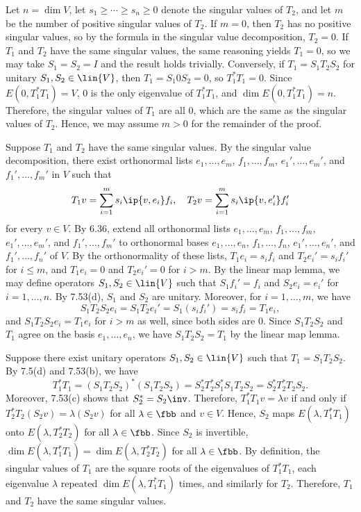 \begin{sol}
    Let $n = \dim V$, let $s_1 \geq \cdots \geq s_n \geq 0$ denote the singular values of $T_2$, and let $m$ be the number of positive singular values of $T_2$.
    If $m = 0$, then $T_2$ has no positive singular values, so by the formula in the singular value decomposition, $T_2 = 0$.
    If $T_1$ and $T_2$ have the same singular values, the same reasoning yields $T_1 = 0$, so we may take $S_1 = S_2 = I$ and the result holds trivially.
    Conversely, if $T_1 = S_1 T_2 S_2$ for unitary $S_1, S_2 \in \lin{V}$, then $T_1 = S_1 0 S_2 = 0$, so $T_1^\ast T_1 = 0$.
    Since $E(0, T_1^\ast T_1) = V$, $0$ is the only eigenvalue of $T_1^\ast T_1$, and $\dim E(0, T_1^\ast T_1) = n$.
    Therefore, the singular values of $T_1$ are all $0$, which are the same as the singular values of $T_2$.
    Hence, we may assume $m > 0$ for the remainder of the proof.
    
    \rightimp Suppose $T_1$ and $T_2$ have the same singular values.
    By the singular value decomposition, there exist orthonormal lists $e_1, \ldots, e_m$, $f_1, \ldots, f_m$, $e_1', \ldots, e_m'$, and $f_1', \ldots, f_m'$ in $V$ such that
    \[
        T_1 v = \sum_{i=1}^m s_i \ip{v, e_i} f_i, \quad T_2 v = \sum_{i=1}^m s_i \ip{v, e_i'} f_i'
    \]
    for every $v \in V$.
    By 6.36, extend all orthonormal lists $e_1, \ldots, e_m$, $f_1, \ldots, f_m$, $e_1', \ldots, e_m'$, and $f_1', \ldots, f_m'$ to orthonormal bases $e_1, \ldots, e_n$, $f_1, \ldots, f_n$, $e_1', \ldots, e_n'$, and $f_1', \ldots, f_n'$ of $V$.
    By the orthonormality of these lists, $T_1 e_i = s_i f_i$ and $T_2 e_i' = s_i f_i'$ for $i \leq m$, and $T_1 e_i = 0$ and $T_2 e_i' = 0$ for $i > m$.
    By the linear map lemma, we may define operators $S_1, S_2 \in \lin{V}$ such that $S_1 f_i' = f_i$ and $S_2 e_i = e_i'$ for $i = 1, \ldots, n$.
    By 7.53(d), $S_1$ and $S_2$ are unitary.
    Moreover, for $i = 1, \ldots, m$, we have
    \[
        S_1 T_2 S_2 e_i = S_1 T_2 e_i' = S_1 (s_i f_i') = s_i f_i = T_1 e_i,
    \]
    and $S_1 T_2 S_2 e_i = T_1 e_i$ for $i > m$ as well, since both sides are $0$.
    Since $S_1 T_2 S_2$ and $T_1$ agree on the basis $e_1, \ldots, e_n$, we have $S_1 T_2 S_2 = T_1$ by the linear map lemma.

    \leftimp Suppose there exist unitary operators $S_1, S_2 \in \lin{V}$ such that $T_1 = S_1 T_2 S_2$.
    By 7.5(d) and 7.53(b), we have
    \[
        T_1^\ast T_1 = (S_1 T_2 S_2)^\ast (S_1 T_2 S_2) = S_2^\ast T_2^\ast S_1^\ast S_1 T_2 S_2 = S_2^\ast T_2^\ast T_2 S_2.
    \]
    Moreover, 7.53(c) shows that $S_2^\ast = S_2\inv$.
    Therefore, $T_1^\ast T_1 v = \lambda v$ if and only if $T_2^\ast T_2 (S_2 v) = \lambda (S_2 v)$ for all $\lambda \in \fbb$ and $v \in V$.
    Hence, $S_2$ maps $E(\lambda, T_1^\ast T_1)$ onto $E(\lambda, T_2^\ast T_2)$ for all $\lambda \in \fbb$.
    Since $S_2$ is invertible, $\dim E(\lambda, T_1^\ast T_1) = \dim E(\lambda, T_2^\ast T_2)$ for all $\lambda \in \fbb$.
    By definition, the singular values of $T_1$ are the square roots of the eigenvalues of $T_1^\ast T_1$, each eigenvalue $\lambda$ repeated $\dim E(\lambda, T_1^\ast T_1)$ times, and similarly for $T_2$.
    Therefore, $T_1$ and $T_2$ have the same singular values.
\end{sol}

